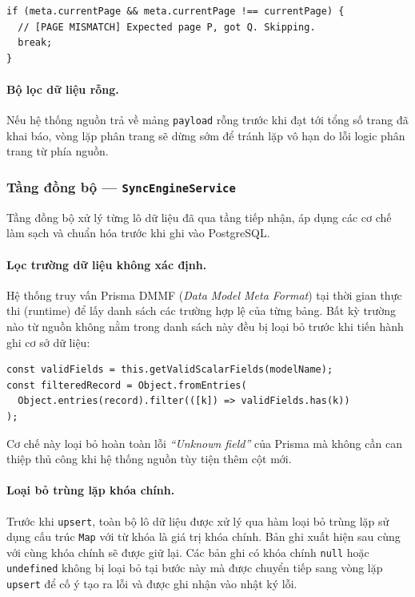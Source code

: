 \begin{verbatim}
if (meta.currentPage && meta.currentPage !== currentPage) {
  // [PAGE MISMATCH] Expected page P, got Q. Skipping.
  break;
}
\end{verbatim}

\paragraph{Bộ lọc dữ liệu rỗng.}
Nếu hệ thống nguồn trả về mảng \texttt{payload} rỗng trước khi đạt tới tổng số trang đã khai báo, vòng lặp phân trang sẽ dừng sớm để tránh lặp vô hạn do lỗi logic phân trang từ phía nguồn.

\subsubsection{Tầng đồng bộ --- \texttt{SyncEngineService}}

Tầng đồng bộ xử lý từng lô dữ liệu đã qua tầng tiếp nhận, áp dụng các cơ chế làm sạch và chuẩn hóa trước khi ghi vào PostgreSQL.

\paragraph{Lọc trường dữ liệu không xác định.}
Hệ thống truy vấn Prisma DMMF (\textit{Data Model Meta Format}) tại thời gian thực thi (runtime) để lấy danh sách các trường hợp lệ của từng bảng. Bất kỳ trường nào từ nguồn không nằm trong danh sách này đều bị loại bỏ trước khi tiến hành ghi cơ sở dữ liệu:

\begin{verbatim}
const validFields = this.getValidScalarFields(modelName);
const filteredRecord = Object.fromEntries(
  Object.entries(record).filter(([k]) => validFields.has(k))
);
\end{verbatim}

Cơ chế này loại bỏ hoàn toàn lỗi \textit{``Unknown field''} của Prisma mà không cần can thiệp thủ công khi hệ thống nguồn tùy tiện thêm cột mới.

\paragraph{Loại bỏ trùng lặp khóa chính.}
Trước khi \texttt{upsert}, toàn bộ lô dữ liệu được xử lý qua hàm loại bỏ trùng lặp sử dụng cấu trúc \texttt{Map} với từ khóa là giá trị khóa chính. Bản ghi xuất hiện sau cùng với cùng khóa chính sẽ được giữ lại. Các bản ghi có khóa chính \texttt{null} hoặc \texttt{undefined} không bị loại bỏ tại bước này mà được chuyển tiếp sang vòng lặp \texttt{upsert} để cố ý tạo ra lỗi và được ghi nhận vào nhật ký lỗi.


